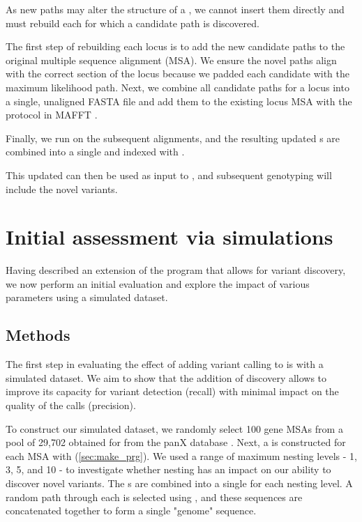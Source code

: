 As new paths may alter the structure of a \prg{}, we cannot insert them directly and must rebuild each \prg{} for which a candidate path is discovered.

The first step of rebuilding each locus \prg{} is to add the new candidate paths to the original multiple sequence alignment (MSA). We ensure the novel paths align with the correct section of the locus because we padded each candidate with the maximum likelihood path. Next, we combine all candidate paths for a locus into a single, unaligned FASTA file and add them to the existing locus MSA with the  protocol in MAFFT \cite{katoh2012}. 

Finally, we run \makeprg{} on the subsequent alignments, and the resulting updated \prg{}s are combined into a single \panrg{} and indexed with \pandora{}. 

This updated \panrg{} can then be used as input to \pandora{}, and subsequent genotyping will include the novel variants.

\section{Initial assessment via simulations}
\label{sec:denovo-sims}
Having described an extension of the \pandora{} program that allows for \denovo{} variant discovery, we now perform an initial evaluation and explore the impact of various parameters using a simulated dataset.

\subsection{Methods}
\label{sec:denovo-sims-methods}

The first step in evaluating the effect of adding \denovo{} variant calling to \pandora{} is with a simulated dataset. We aim to show that the addition of \denovo{} discovery allows \pandora{} to improve its capacity for variant detection (recall) with minimal impact on the quality of the calls (precision). 

To construct our simulated dataset, we randomly select 100 gene MSAs from a pool of 29,702 obtained for \ecoli{} from the panX database \cite{panx}. Next, a \prg{} is constructed for each MSA with \makeprg{} (\autoref{sec:make_prg}). We used a range of \makeprg{} maximum nesting levels - 1, 3, 5, and 10 - to investigate whether \prg{} nesting has an impact on our ability to discover novel variants. The \prg{}s are combined into a single \panrg{} for each nesting level. A random path through each \prg{} is selected using \pandora{}, and these sequences are concatenated together to form a single "genome" sequence. 

